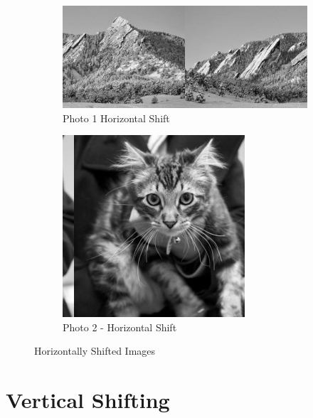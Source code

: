 \documentclass[10pt]{report}
\begin{document}
    \begin{figure}[ht]
        \centering
        \begin{subfigure}{\textwidth}
            \centering
            \includegraphics[scale=0.7]{./img/hsg1.png}
            \caption{Photo 1 Horizontal Shift}
            \label{fig:p1hg}
        \end{subfigure}
        \begin{subfigure}{\textwidth}
            \centering
            \includegraphics[scale=0.7]{./img/hsg2.png}
            \caption{Photo 2 - Horizontal Shift}
            \label{fig:p2hg}
        \end{subfigure}
        \caption{Horizontally Shifted Images}
        \label{fig:hs_images}
    \end{figure}

\section{Vertical Shifting}
\end{document}
